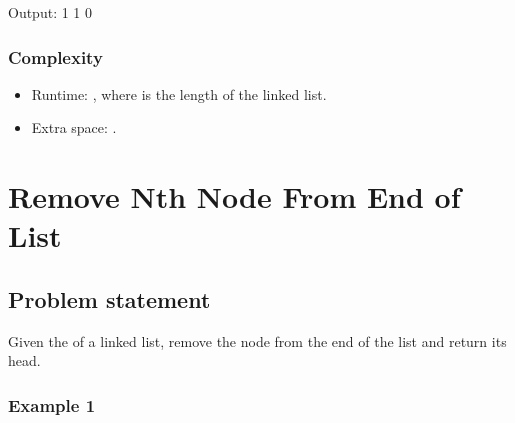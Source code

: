 \documentclass[letterpaper,12pt,english]{book}
\begin{document}
\begin{sphinxVerbatim}[commandchars=\\\{\}]
Output:
1
1
0
\end{sphinxVerbatim}


\subsubsection{Complexity}
\label{\detokenize{Two_Pointers/08_TP_141_Linked_List_Cycle:id4}}\begin{itemize}
\item {} 
\sphinxAtStartPar
Runtime: , where  is the length of the linked list.

\item {} 
\sphinxAtStartPar
Extra space: .

\end{itemize}

\sphinxstepscope


\section{Remove Nth Node From End of List}
\label{\detokenize{Two_Pointers/08_TP_19_Remove_Nth_Node_From_End_of_List:remove-nth-node-from-end-of-list}}\label{\detokenize{Two_Pointers/08_TP_19_Remove_Nth_Node_From_End_of_List::doc}}

\subsection{Problem statement\sphinxfootnotemark[108]}
\label{\detokenize{Two_Pointers/08_TP_19_Remove_Nth_Node_From_End_of_List:problem-statement}}%
\begin{footnotetext}[108]\sphinxAtStartFootnote
{}
%
\end{footnotetext}\ignorespaces 
\sphinxAtStartPar
Given the  of a linked list, remove the  node from the end of the list and return its head.


\subsubsection{Example 1}
\label{\detokenize{Two_Pointers/08_TP_19_Remove_Nth_Node_From_End_of_List:example-1}}
\sphinxAtStartPar
{}
\end{document}
